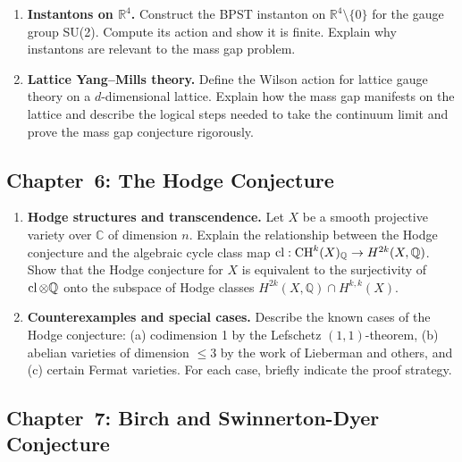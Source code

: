 \begin{enumerate}[label=\textbf{A5.\arabic*.},leftmargin=2.5em]
\item \textbf{Instantons on $\mathbb{R}^4$.}
Construct the BPST instanton on $\mathbb{R}^4 \setminus \{0\}$ for the gauge group SU(2). Compute its action and show it is finite. Explain why instantons are relevant to the mass gap problem.

\item \textbf{Lattice Yang--Mills theory.}
Define the Wilson action for lattice gauge theory on a $d$-dimensional lattice. Explain how the mass gap manifests on the lattice and describe the logical steps needed to take the continuum limit and prove the mass gap conjecture rigorously.
\end{enumerate}

\subsection{Chapter~6: The Hodge Conjecture}

\begin{enumerate}[label=\textbf{A6.\arabic*.},leftmargin=2.5em]
\item \textbf{Hodge structures and transcendence.}
Let $X$ be a smooth projective variety over $\mathbb{C}$ of dimension $n$. Explain the relationship between the Hodge conjecture and the algebraic cycle class map $\operatorname{cl}: \text{CH}^k(X)_{\mathbb{Q}} \to H^{2k}(X, \mathbb{Q})$. Show that the Hodge conjecture for $X$ is equivalent to the surjectivity of $\operatorname{cl} \otimes \mathbb{Q}$ onto the subspace of Hodge classes $H^{2k}(X, \mathbb{Q}) \cap H^{k,k}(X)$.

\item \textbf{Counterexamples and special cases.}
Describe the known cases of the Hodge conjecture: (a) codimension 1 by the Lefschetz $(1,1)$-theorem, (b) abelian varieties of dimension $\leq 3$ by the work of Lieberman and others, and (c) certain Fermat varieties. For each case, briefly indicate the proof strategy.
\end{enumerate}

\subsection{Chapter~7: Birch and Swinnerton-Dyer Conjecture}

